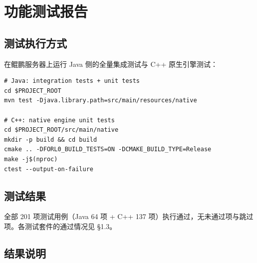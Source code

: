 \documentclass[a4paper,11pt]{article}
\begin{document}
\section{功能测试报告}

\subsection{测试执行方式}

在鲲鹏服务器上运行 Java 侧的全量集成测试与 C++ 原生引擎测试：

\begin{lstlisting}[language=shellcmd]
# Java: integration tests + unit tests
cd $PROJECT_ROOT
mvn test -Djava.library.path=src/main/resources/native

# C++: native engine unit tests
cd $PROJECT_ROOT/src/main/native
mkdir -p build && cd build
cmake .. -DFORL0_BUILD_TESTS=ON -DCMAKE_BUILD_TYPE=Release
make -j$(nproc)
ctest --output-on-failure
\end{lstlisting}

\subsection{测试结果}

全部 201 项测试用例（Java 64 项 + C++ 137 项）执行通过，无未通过项与跳过项。各测试套件的通过情况见 \S1.3。

\subsection{结果说明}
\end{document}
